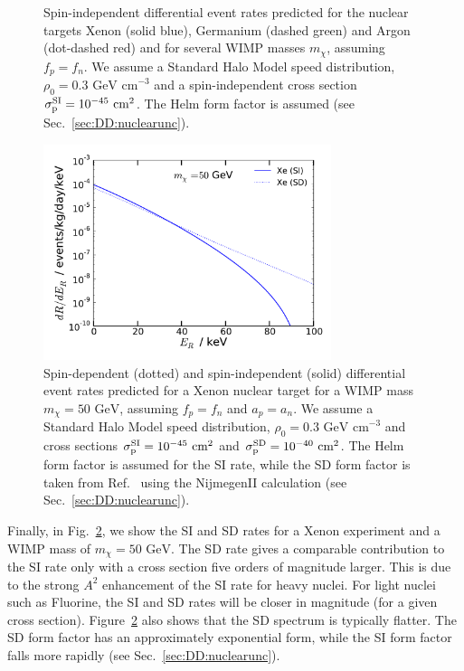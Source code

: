 \begin{figure}[p]
  \caption[Examples of spin-independent event spectra for direct detection experiments]{Spin-independent differential event rates predicted for the nuclear targets Xenon (solid blue), Germanium (dashed green) and Argon (dot-dashed red) and for several WIMP masses $m_\chi$, assuming $f_p = f_n$. We assume a Standard Halo Model speed distribution, $\rho_0 = 0.3 \textrm{ GeV cm}^{-3}$ and a spin-independent cross section $\sigmapsi = 10^{-45} \textrm{ cm}^2$. The Helm form factor \cite{Helm:1956} is assumed (see Sec.~\ref{sec:DD:nuclearunc}).}
  \label{fig:DD:spectra}
\end{figure}

\begin{figure}[ht]
\centering
  \includegraphics[width=0.75\textwidth]{DirectDetection/SpectraSISD_50GeV.pdf}
  \caption[Comparison of spin-dependent and spin-independent rates for a Xenon experiment]{Spin-dependent (dotted) and spin-independent (solid) differential event rates predicted for a Xenon nuclear target for a WIMP mass $m_\chi = 50 \textrm{ GeV}$, assuming $f_p = f_n$ and $a_p = a_n$. We assume a Standard Halo Model speed distribution, $\rho_0 = 0.3 \textrm{ GeV cm}^{-3}$ and cross sections $\sigmapsi = 10^{-45} \textrm{ cm}^2$ and $\sigmapsd = 10^{-40} \textrm{ cm}^2$. The Helm form factor \cite{Helm:1956} is assumed for the SI rate, while the SD form factor is taken from Ref.~\cite{Ressell:1997} using the NijmegenII calculation (see Sec.~\ref{sec:DD:nuclearunc}).}
  \label{fig:DD:spectraSISD}
\end{figure}


Finally, in Fig.~\ref{fig:DD:spectraSISD}, we show the SI and SD rates for a Xenon experiment and a WIMP mass of $m_\chi = 50 \textrm{ GeV}$. The SD rate gives a comparable contribution to the SI rate only with a cross section five orders of magnitude larger. This is due to the strong $A^2$ enhancement of the SI rate for heavy nuclei. For light nuclei such as Fluorine, the SI and SD rates will be closer in magnitude (for a given cross section). Figure~\ref{fig:DD:spectraSISD} also shows that the SD spectrum is typically flatter. The SD form factor has an approximately exponential form, while the SI form factor falls more rapidly (see Sec.~\ref{sec:DD:nuclearunc}).

